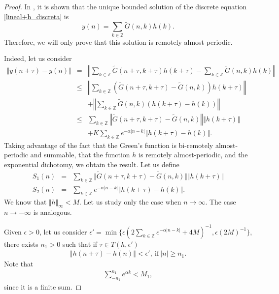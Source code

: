\documentclass[english,,reqno]{amsart}
\numberwithin{equation}{section}
\newcommand{\bb}[1]{\mathbb{#1}}
\theoremstyle{plain}
\theoremstyle{definition}
\theoremstyle{remark}
\begin{document}
\begin{proof}
In \cite[Theorem 5.7]{zhang_APTE}, it is shown that the unique bounded solution of the discrete equation \eqref{lineal+h_discreta} is  
\[
y(n) = \sum_{k \in \mathbb{Z}} \tilde{G}(n,k)h(k).
\]  
Therefore, we will only prove that this solution is remotely almost-periodic.

Indeed, let us consider
\begin{eqnarray*}
\Vert y(n+\tau)-y(n)\Vert 
&=& \left\Vert \sum_{k\in \bb{Z}} \tilde{G}(n+\tau ,k+\tau)h(k+\tau)-\sum_{k\in \bb{Z}} \tilde{G}(n,k)h(k) \right\Vert\\
&\leq& \left\Vert \sum_{k\in \bb{Z}} (\tilde{G}(n+\tau ,k+\tau)- \tilde{G}(n,k))h(k+\tau) \right\Vert \\
& &+ \left\Vert \sum_{k\in \bb{Z}} \tilde{G}(n,k)(h(k+\tau)-h(k)) \right\Vert \\
&\leq&\sum_{k\in\mathbb{Z}}\left\Vert \tilde{G}(n+\tau,k+\tau)-\tilde{G}(n,k)\right\Vert \left\Vert h(k+\tau)\right\Vert\\
&&+K\sum_{k\in\mathbb{Z}}e^{-\alpha\left|n-k\right|}\left\Vert h(k+\tau)-h(k)\right\Vert.
\end{eqnarray*}
Taking advantage of the fact that the Green's function is bi-remotely almost-periodic and summable,  
that the function $h$ is remotely almost-periodic, and the exponential dichotomy, we obtain the result.
Let us define
\begin{eqnarray*}
S_1(n) &=& \sum_{k\in\bb{Z}} \Vert \tilde{G}(n+\tau ,k+\tau)-\tilde{G}(n,k)\Vert \Vert h(k+\tau)\Vert \label{S_1}\\
S_2(n) &=&  \sum_{k\in\bb{Z}} e^{-\alpha\vert n-k\vert} \Vert h(k+\tau)-h(k)\Vert.
\end{eqnarray*}
We know that $\Vert h \Vert_{\infty} < M$. Let us study only the case when $n \rightarrow \infty$. The case $n \rightarrow -\infty$ is analogous.

Given $\epsilon > 0$, let us consider
 $\epsilon'=\min\{\epsilon(2\sum_{k\in\bb{Z}}e^{-\alpha\vert n-k\vert}+4M)^{-1},\epsilon(2M)^{-1}\}$, there exists $n_1>0$ such that if $\tau\in T(h,\epsilon')$
\begin{eqnarray}
\left\Vert h(n+\tau)-h(n) \right\Vert < \epsilon',\ \mathrm{if}\ \vert n\vert \geq n_1 .\label{rap_h_n1}
\end{eqnarray}
Note that  
\begin{eqnarray*}
\sum_{-n_1}^{n_1} e^{\alpha k} < M_1,
\end{eqnarray*}  
since it is a finite sum.  


\end{proof}
\end{document}
